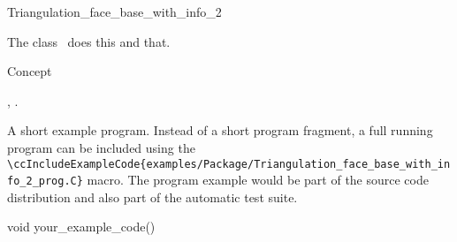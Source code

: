 

\begin{ccRefClass}{Triangulation_face_base_with_info_2}  %


\ccDefinition
  
The class \ccRefName\ does this and that.


\ccIsModel

Concept

\ccTypes


\ccCreation
{}  %


\ccOperations


\ccSeeAlso

,
.

\ccExample

A short example program.
Instead of a short program fragment, a full running program can be
included using the 
\verb|\ccIncludeExampleCode{examples/Package/Triangulation_face_base_with_info_2_prog.C}| 
macro. The program example would be part of the source code distribution and
also part of the automatic test suite.

\begin{ccExampleCode}
void your_example_code() {
}
\end{ccExampleCode}


\end{ccRefClass}


